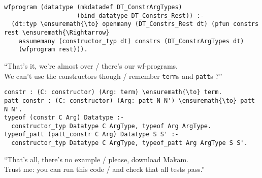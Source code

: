 \begin{verbatim}
wfprogram (datatype (mkdatadef DT_ConstrArgTypes)
                    (bind_datatype DT_Constrs_Rest)) :-
  (dt:typ \ensuremath{\to} openmany (DT_Constrs_Rest dt) (pfun constrs rest \ensuremath{\Rightarrow}
    assumemany (constructor_typ dt) constrs (DT_ConstrArgTypes dt)
    (wfprogram rest))).
\end{verbatim}

\begin{versy}
``That's it, we're almost over / there's our wf-programs. \\
We can't use the constructors though / remember \texttt{term}s and \texttt{patt}s ?''
\end{versy}

\begin{verbatim}
constr : (C: constructor) (Arg: term) \ensuremath{\to} term.
patt_constr : (C: constructor) (Arg: patt N N') \ensuremath{\to} patt N N'.
typeof (constr C Arg) Datatype :-
  constructor_typ Datatype C ArgType, typeof Arg ArgType.
typeof_patt (patt_constr C Arg) Datatype S S' :-
  constructor_typ Datatype C ArgType, typeof_patt Arg ArgType S S'.
\end{verbatim}

\begin{versy}
``That's all, there's no example / please, download Makam. \\
Trust me: you can run this code / and check that all tests pass.''
\end{versy}

